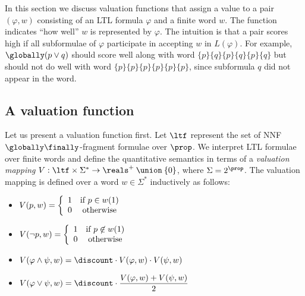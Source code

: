 In this section we discuss valuation functions that assign a value to a pair
$(\varphi,w)$ consisting of an LTL formula $\varphi$ and a finite word $w$. The
function indicates ``how well'' $w$ is represented by $\varphi$. The intuition
is that a pair scores high if all subformulae of $\varphi$ participate in
accepting $w$ in $L(\varphi)$. For example, $\globally(p\lor q)$ should score
well along with word $\{p\}\{q\}\{p\}\{q\}\{p\}\{q\}$ but should not do well
with word $\{p\}\{p\}\{p\}\{p\}\{p\}\{p\}$, since subformula $q$ did not appear
in the word.

\subsection{A valuation function}

Let us present a valuation function first.
Let $\ltf$ represent the set of NNF $\globally\finally$-fragment formulae over $\prop$.  
We interpret LTL formulae over finite words and define the quantitative
semantics in terms of a \emph{valuation mapping} $V : \ltf \times \Sigma^* \to
\reals ^+ \: \union \: \{0\}$, where $\Sigma=2^{\prop}$. The valuation mapping
is defined over a word $w \in \Sigma^*$ inductively as follows:

\begin{minipage}{0.43\linewidth}
\begin{itemize}
\item $V(p, w) =  \left \{ \begin{array}{cc} 1 & \textnormal{if } p \in w(1)
                             \\
                             0 & \textnormal{otherwise}
                           \end{array}
                         \right.  $
\item $V(\lnot p, w) =  \left \{ \begin{array}{cc} 1 & \textnormal{if } p \not\in w(1)
                             \\
                             0 & \textnormal{otherwise}
                           \end{array}
                         \right.  $                            
\end{itemize}
\end{minipage}
\begin{minipage}{0.55\linewidth}
\begin{itemize}
\item $V(\varphi \land \psi, w) = \discount \cdot V(\varphi, w) \cdot V(\psi, w)$
\item $V(\varphi \lor \psi, w) = \discount \cdot \dfrac{V(\varphi, w) + V(\psi, w)}{2}$
\end{itemize}  
\end{minipage}

